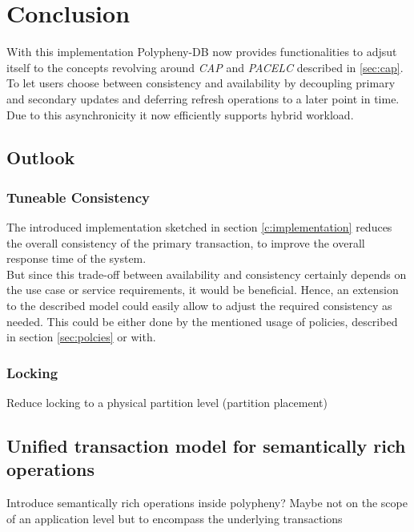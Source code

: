 \chapter{Conclusion}
\label{c:conclusion}


With this implementation Polypheny-DB now provides functionalities to adjsut itself to the concepts revolving around \emph{CAP} and \emph{PACELC} described in \ref{sec:cap}.
To let users choose between consistency and availability by decoupling primary and secondary updates and deferring refresh operations to a later point in time.
Due to this asynchronicity it now efficiently supports hybrid workload. 


\section{Outlook}

\subsection{Tuneable Consistency}
The introduced implementation sketched in section \ref{c:implementation} reduces the overall consistency of the primary transaction,
to improve the overall response time of the system.\\ 
But since this trade-off between availability and consistency certainly depends on the use case or service requirements, it would be beneficial.
Hence, an extension to the described model could easily allow to adjust the required consistency as needed. 
This could be either done by the mentioned usage of policies, described in section \ref{sec:polcies} or with.

\subsection{Locking}
Reduce locking to a physical partition level  (partition placement)



\tocless\section{Unified transaction model for semantically rich operations}
Introduce semantically rich operations inside polypheny? 
Maybe not on the scope of an application level but to encompass the underlying transactions